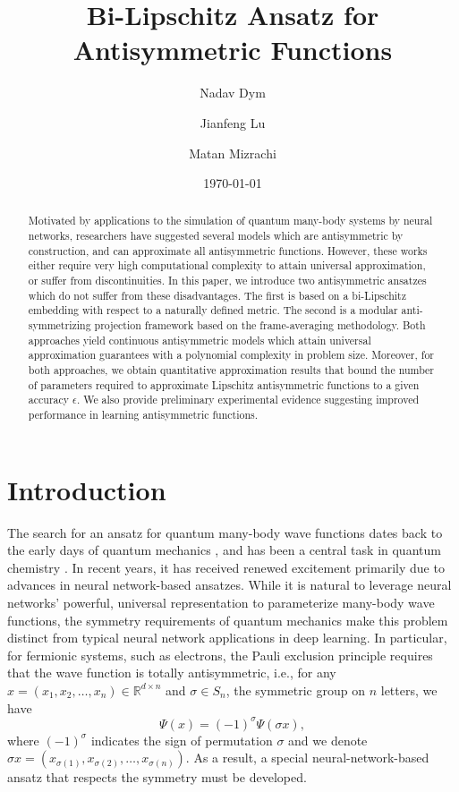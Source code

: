 \documentclass{amsart}
\title{Bi-Lipschitz Ansatz for Antisymmetric Functions}
\author{Nadav Dym}
\author{Jianfeng Lu}
\author{Matan Mizrachi}
\date{\today}
\theoremstyle{plain}
\theoremstyle{definition}
\theoremstyle{remark}
\newcommand{\RR}{\mathbb{R}}
\begin{document}
\begin{abstract}
Motivated by applications to the simulation of quantum many-body systems by neural networks, researchers have suggested several models which are antisymmetric by construction, and can approximate all antisymmetric functions. However, these works either require very high computational complexity to attain universal approximation, or suffer from discontinuities. In this paper, we introduce two antisymmetric ansatzes which do not suffer from these disadvantages. The first is based on a bi-Lipschitz embedding with respect to a naturally defined metric. The second is a modular anti-symmetrizing projection framework based on the frame-averaging methodology. Both approaches yield continuous antisymmetric models which attain universal approximation guarantees with a polynomial complexity in problem size. Moreover, for both approaches, we obtain quantitative approximation results that bound the number of parameters required to approximate Lipschitz antisymmetric functions to a given accuracy $\epsilon$. We also provide preliminary experimental evidence suggesting improved performance in learning antisymmetric functions.
\end{abstract}

\maketitle

\section{Introduction}

The search for an ansatz for quantum many-body wave functions dates back to the early days of quantum mechanics \cite{slater1929theory}, and has been a central task in quantum chemistry \cite{szabo1996modern}. In recent years, it has received renewed excitement primarily due to advances in neural network-based ansatzes. While it is natural to leverage neural networks' powerful, universal representation to parameterize many-body wave functions, the symmetry requirements of quantum mechanics make this problem distinct from typical neural network applications in deep learning. In particular, for fermionic systems, such as electrons, the Pauli exclusion principle requires that the wave function is totally antisymmetric, i.e., for any $x = \left(x_1, x_2, \ldots, x_n \right) \in \RR^{d \times n}$ and $\sigma \in S_n$, the symmetric group on $n$ letters, we have 
\begin{equation}\label{eq:antisymmetric}
    \Psi(x) = (-1)^{\sigma} \Psi(\sigma x),
\end{equation}
where $(-1)^{\sigma}$ indicates the sign of permutation $\sigma$ and we denote $\sigma x = \left(x_{\sigma(1)}, x_{\sigma(2)}, \ldots, x_{\sigma(n)} \right)$. As a result, a special neural-network-based ansatz that respects the symmetry must be developed. 
\end{document}
